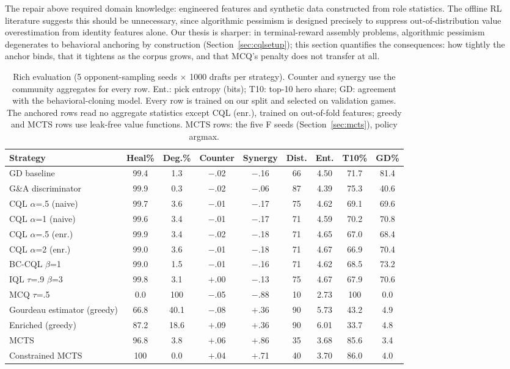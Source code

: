 \documentclass[journal]{IEEEtran}
\providecommand{\DIFaddtex}[1]{{\protect\color{blue} \sf #1}} %
\providecommand{\DIFdeltex}[1]{{\protect\color{red} \scriptsize #1}} %
\providecommand{\DIFaddbegin}{} %
\providecommand{\DIFaddend}{} %
\providecommand{\DIFdelbegin}{} %
\providecommand{\DIFdelend}{} %
\providecommand{\DIFaddFL}[1]{\DIFadd{#1}} %
\providecommand{\DIFadd}[1]{\texorpdfstring{\DIFaddtex{#1}}{#1}} %
\providecommand{\DIFdel}[1]{\texorpdfstring{\DIFdeltex{#1}}{}} %
\begin{document}
\DIFdelbegin \DIFdel{The repair above required domain knowledge: engineered features and synthetic data constructed from role statistics. The offline RL literature suggests this should be unnecessary, since algorithmic pessimism is designed precisely to suppress out-of-distribution value overestimation from identity features alone. Our thesis is sharper: in terminal-reward assembly problems, algorithmic pessimism degenerates to behavioral anchoring by construction (Section~\ref{sec:cqlsetup}); this section quantifies the consequences: how tightly the anchor binds, that it tightens as the corpus grows, and that MCQ's penalty does not transfer at all.
}\DIFdelend \DIFaddbegin \begin{table}[t]
\centering
\caption{\DIFaddFL{Rich evaluation (5 opponent-sampling seeds $\times$ 1000 drafts per strategy). Counter and synergy use the community aggregates for every row. Ent.: pick entropy (bits); T10: top-10 hero share; GD: agreement with the behavioral-cloning model. Every row is trained on our split and selected on validation games. The anchored rows read no aggregate statistics except CQL (enr.), trained on out-of-fold features; greedy and MCTS rows use leak-free value functions. MCTS rows: the five F seeds (Section~\ref{sec:mcts}), policy argmax.}}
\label{tab:rich}
\begin{tabular}{lcccccccc}
\toprule
Strategy & Heal\% & Deg.\% & Counter & Synergy & Dist. & Ent. & T10\% & GD\% \\
\midrule
GD baseline & 99.4 & 1.3 & $-$.02 & $-$.16 & 66 & 4.50 & 71.7 & 81.4 \\
G\&A discriminator & 99.9 & 0.3 & $-$.02 & $-$.06 & 87 & 4.39 & 75.3 & 40.6 \\
CQL $\alpha$=.5 (naive) & 99.7 & 3.6 & $-$.01 & $-$.17 & 75 & 4.62 & 69.1 & 69.6 \\
CQL $\alpha$=1 (naive) & 99.6 & 3.4 & $-$.01 & $-$.17 & 71 & 4.59 & 70.2 & 70.8 \\
CQL $\alpha$=.5 (enr.) & 99.9 & 3.4 & $-$.02 & $-$.18 & 71 & 4.65 & 67.0 & 68.4 \\
CQL $\alpha$=2 (enr.) & 99.0 & 3.6 & $-$.01 & $-$.18 & 71 & 4.67 & 66.9 & 70.4 \\
BC-CQL $\beta$=1 & 99.0 & 1.5 & $-$.01 & $-$.16 & 71 & 4.62 & 68.5 & 73.2 \\
IQL $\tau$=.9 $\beta$=3 & 99.8 & 3.1 & $+$.00 & $-$.13 & 75 & 4.67 & 67.9 & 70.6 \\
MCQ $\tau$=.5 & 0.0 & 100 & $-$.05 & $-$.88 & 10 & 2.73 & 100 & 0.0 \\
\midrule
Gourdeau estimator (greedy) & 66.8 & 40.1 & $-$.08 & $+$.36 & 90 & 5.73 & 43.2 & 4.9 \\
Enriched (greedy) & 87.2 & 18.6 & $+$.09 & $+$.36 & 90 & 6.01 & 33.7 & 4.8 \\
MCTS & 96.8 & 3.8 & $+$.06 & $+$.86 & 35 & 3.68 & 85.6 & 3.4 \\
Constrained MCTS & 100 & 0.0 & $+$.04 & $+$.71 & 40 & 3.70 & 86.0 & 4.0 \\
\bottomrule
\end{tabular}
\end{table}
\DIFaddend 
\end{document}
